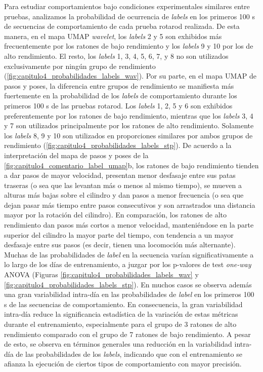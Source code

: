 Para estudiar comportamientos bajo condiciones experimentales similares entre pruebas, analizamos la probabilidad de ocurrencia de \textit{labels} en los primeros 100 s de secuencias de comportamiento de cada prueba rotarod realizada. De esta manera, en el mapa UMAP \textit{wavelet}, los \textit{labels} 2 y 5 son exhibidos más frecuentemente por los ratones de bajo rendimiento y los \textit{labels} 9 y 10 por los de alto rendimiento. El resto, los \textit{labels} 1, 3, 4, 5, 6, 7, y 8 no son utilizados exclusivamente por ningún grupo de rendimiento (\autoref{fig:capitulo4_probabilidades_labels_wav}). Por su parte, en el mapa UMAP de pasos y poses, la diferencia entre grupos de rendimiento se manifiesta más fuertemente en la probabilidad de los \textit{labels} de comportamiento durante los primeros 100 s de las pruebas rotarod. Los \textit{labels} 1, 2, 5 y 6 son exhibidos preferentemente por los ratones de bajo rendimiento, mientras que los \textit{labels} 3, 4 y 7 son utilizados principalmente por los ratones de alto rendimiento. Solamente los \textit{labels} 8, 9 y 10 son utilizados en proporciones similares por ambos grupos de rendimiento (\autoref{fig:capitulo4_probabilidades_labels_stp}). De acuerdo a la interpretación del mapa de pasos y poses de la \autoref{fig:capitulo4_comentario_label_umap}b, los ratones de bajo rendimiento tienden a dar pasos de mayor velocidad, presentan menor desfasaje entre sus patas traseras (o sea que las levantan más o menos al mismo tiempo), se mueven a alturas más bajas sobre el cilindro y dan pasos a menor frecuencia (o sea que dejan pasar más tiempo entre pasos consecutivos y son arrastrados una distancia mayor por la rotación del cilindro). En comparación, los ratones de alto rendimiento dan pasos más cortos a menor velocidad, manteniéndose en la parte superior del cilindro la mayor parte del tiempo, con tendencia a un mayor desfasaje entre sus pasos (es decir, tienen una locomoción más alternante). Muchas de las probabilidades de \textit{label} en la secuencia varían significativamente a lo largo de los días de entrenamiento, a juzgar por los p-valores de test \textit{one-way} ANOVA (Figuras \ref{fig:capitulo4_probabilidades_labels_wav} y \ref{fig:capitulo4_probabilidades_labels_stp}). En muchos casos se observa además una gran variabilidad intra-día en las probabilidades de \textit{label} en los primeros 100 s de las secuencias de comportamiento. En consecuencia, la gran variabilidad intra-día reduce la significancia estadística de la variación de estas métricas durante el entrenamiento, especialmente para el grupo de 3 ratones de alto rendimiento comparado con el grupo de 7 ratones de bajo rendimiento. A pesar de esto, se observa en términos generales una reducción en la variabilidad intra-día de las probabilidades de los \textit{labels}, indicando que con el entrenamiento se afianza la ejecución de ciertos tipos de comportamiento con mayor precisión.

